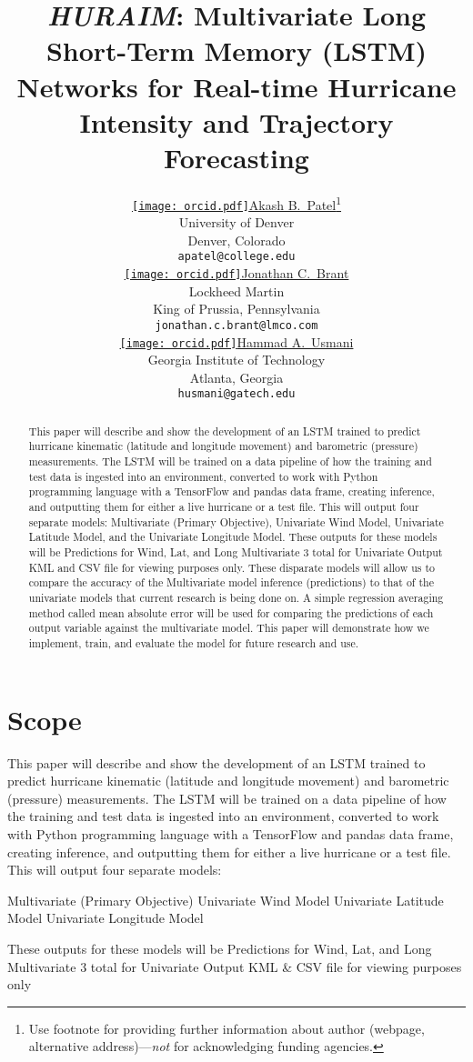\documentclass{article}
\title{\emph{HURAIM}: Multivariate Long Short-Term Memory (LSTM) Networks for Real-time Hurricane Intensity and Trajectory Forecasting}
\author{ \href{https://orcid.org/0000-0000-0000-0000}{\texttt{[image: orcid.pdf]}\hspace{1mm}Akash B.~Patel}\thanks{Use footnote for providing further
		information about author (webpage, alternative
		address)---\emph{not} for acknowledging funding agencies.} \\
	University of Denver\\
	Denver, Colorado \\
	\texttt{apatel@college.edu} \\
	\And
	\href{https://orcid.org/0000-0000-0000-0000}{\texttt{[image: orcid.pdf]}\hspace{1mm}Jonathan C.~Brant} \\
	Lockheed Martin\\
	King  of Prussia, Pennsylvania \\
	\texttt{jonathan.c.brant@lmco.com} \\
	\And
	\href{https://orcid.org/0000-0000-0000-0000}{\texttt{[image: orcid.pdf]}\hspace{1mm}Hammad A.~Usmani} \\
	Georgia Institute of Technology\\
	Atlanta, Georgia \\
	\texttt{husmani@gatech.edu} \\
}
\begin{document}
\maketitle

\begin{abstract}
	This paper will describe and show the development of an LSTM trained to predict hurricane kinematic (latitude and longitude movement) and barometric (pressure) measurements. The LSTM will be trained on a data pipeline of how the training and test data is ingested into an environment, converted to work with Python programming language with a TensorFlow and pandas data frame, creating inference, and outputting them for either a live hurricane or a test file. This will output four separate models: Multivariate (Primary Objective), Univariate Wind Model, Univariate Latitude Model, and the Univariate Longitude Model. These outputs for these models will be Predictions for Wind, Lat, and Long Multivariate 3 total for Univariate Output KML and CSV file for viewing purposes only. These disparate models will allow us to compare the accuracy of the Multivariate model inference (predictions) to that of the univariate models that current research is being done on. A simple regression averaging method called mean absolute error will be used for comparing the predictions of each output variable against the multivariate model. This paper will demonstrate how we implement, train, and evaluate the model for future research and use.
\end{abstract}


\section{Scope}
This paper will describe and show the development of an LSTM trained to predict hurricane kinematic (latitude and longitude movement) and barometric (pressure) measurements. The LSTM will be trained on a data pipeline of how the training and test data is ingested into an environment, converted to work with Python programming language with a TensorFlow and pandas data frame, creating inference, and outputting them for either a live hurricane or a test file. This will output four separate models:

Multivariate (Primary Objective)
Univariate Wind Model
Univariate Latitude Model
Univariate Longitude Model

These outputs for these models will be 
Predictions for Wind, Lat, and Long
Multivariate
3 total for Univariate
Output KML & CSV file for viewing purposes only
\end{document}
